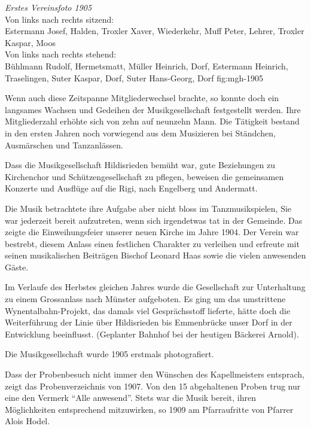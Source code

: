 

{\emph{Erstes Vereinsfoto 1905}\\
    Von links nach rechts sitzend:\\
    Estermann Josef, Halden, Troxler Xaver, Wiederkehr, Muff Peter, Lehrer,
    Troxler Kaspar, Moos\\
    Von links nach rechts stehend:\\
    Bühlmann Rudolf, Hermetsmatt, Müller Heinrich, Dorf, Estermann Heinrich,
    Traselingen, Suter Kaspar, Dorf, Suter Hans-Georg, Dorf} {fig:mgh-1905}

\begin{history}

    Wenn auch diese Zeitspanne Mitgliederwechsel brachte, so konnte doch ein
    langsames Wachsen und Gedeihen der Musikgesellschaft festgestellt werden.
    Ihre Mitgliederzahl erhöhte sich von zehn auf neunzehn Mann. Die Tätigkeit
    bestand in den ersten Jahren noch vorwiegend aus dem Musizieren bei
    Ständchen, Ausmärschen und Tanzanlässen.

    Dass die Musikgesellschaft Hildisrieden bemüht war, gute Beziehungen zu
    Kirchenchor und Schützengesellschaft zu pflegen, beweisen die gemeinsamen
    Konzerte und Ausflüge auf die Rigi, nach Engelberg und Andermatt.

    Die Musik betrachtete ihre Aufgabe aber nicht bloss im Tanzmusikspielen, Sie
    war jederzeit bereit aufzutreten, wenn sich irgendetwas tat in der Gemeinde.
    Das zeigte die Einweihungsfeier unserer neuen Kirche im Jahre 1904. Der
    Verein war bestrebt, diesem Anlass einen festlichen Charakter zu verleihen
    und erfreute mit seinen musikalischen Beiträgen Bischof Leonard Haas sowie
    die vielen anwesenden Gäste.

    Im Verlaufe des Herbstes gleichen Jahres wurde die Gesellschaft zur
    Unterhaltung zu einem Grossanlass nach Münster aufgeboten. Es ging um das
    umstrittene Wynentalbahn-Projekt, das damals viel Gesprächsstoff lieferte,
    hätte doch die Weiterführung der Linie über Hildisrieden bis Emmenbrücke
    unser Dorf in der Entwicklung beeinflusst. (Geplanter Bahnhof bei der
    heutigen Bäckerei Arnold).

    Die Musikgesellschaft wurde 1905 erstmals photografiert.

    Dass der Probenbesuch nicht immer den Wünschen des Kapellmeisters entsprach,
    zeigt das Probenverzeichnis von 1907. Von den 15 abgehaltenen Proben trug
    nur eine den Vermerk \enquote{Alle anwesend}. Stets war die Musik bereit,
    ihren Möglichkeiten entsprechend mitzuwirken, so 1909 am Pfarraufritte von
    Pfarrer Alois Hodel.


\end{history}
